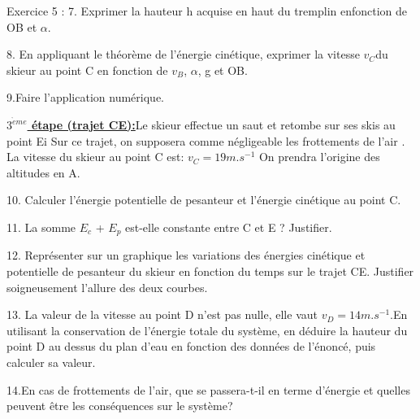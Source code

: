 \documentclass[12pt, french]{article}
\begin{document}
\begin{Box2}{Exercice 5 : }
7. Exprimer la hauteur h acquise en haut du tremplin enfonction de OB et $\alpha$.

8. En appliquant le théorème de l’énergie cinétique, exprimer la vitesse $v_C$du skieur au point C en fonction de $v_B$, $\alpha$, g et OB.

9.Faire l’application numérique.

\vspace{0.2cm}
   \underline{  \textbf{ $3^{\grave{e}me}$ étape (trajet CE):}}Le skieur effectue un saut et retombe sur ses skis au point Ei Sur ce trajet, on supposera comme négligeable les frottements de l’air . La vitesse du skieur au point C est:  $v_C= 19 m.s^{-1}$ On prendra l’origine des altitudes en A.

10. Calculer l’énergie potentielle de pesanteur et l’énergie cinétique au point C.

11. La somme $E_c$ + $E_p$ est-elle constante entre C et E ? Justifier.

12. Représenter sur un graphique les variations des énergies cinétique et potentielle de pesanteur du skieur en fonction du temps sur le trajet CE. Justifier soigneusement l’allure des deux courbes.

13. La valeur de la vitesse au point D n’est pas nulle, elle vaut $v_D= 14 m.s^{-1}$.En utilisant la conservation de l’énergie totale du système, en déduire la hauteur du point D au dessus du plan d’eau en fonction des données de l’énoncé, puis calculer sa valeur.

14.En cas de frottements de l’air, que se passera-t-il en terme d’énergie et quelles peuvent être les conséquences sur le système?
\end{Box2}
\end{document}
